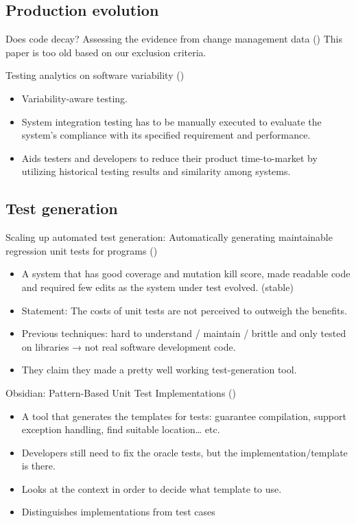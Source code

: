 \documentclass[]{book}
\providecommand{\tightlist}{%
  \setlength{\itemsep}{0pt}\setlength{\parskip}{0pt}}
\begin{document}
\subsection{Production evolution}\label{production-evolution}

Does code decay? Assessing the evidence from change management data
(\citet{eick2001}) This paper is too old based on our exclusion
criteria.

Testing analytics on software variability (\citet{leung2015testing})

\begin{itemize}
\tightlist
\item
  Variability-aware testing.
\item
  System integration testing has to be manually executed to evaluate the
  system's compliance with its specified requirement and performance.
\item
  Aids testers and developers to reduce their product time-to-market by
  utilizing historical testing results and similarity among systems.
\end{itemize}

\subsection{Test generation}\label{test-generation}

Scaling up automated test generation: Automatically generating
maintainable regression unit tests for programs (\citet{robinson2011})

\begin{itemize}
\tightlist
\item
  A system that has good coverage and mutation kill score, made readable
  code and required few edits as the system under test evolved. (stable)
\item
  Statement: The costs of unit tests are not perceived to outweigh the
  benefits.
\item
  Previous techniques: hard to understand / maintain / brittle and only
  tested on libraries → not real software development code.
\item
  They claim they made a pretty well working test-generation tool.
\end{itemize}

Obsidian: Pattern-Based Unit Test Implementations
(\citet{bowring2014obsidian})

\begin{itemize}
\tightlist
\item
  A tool that generates the templates for tests: guarantee compilation,
  support exception handling, find suitable location\ldots{} etc.
\item
  Developers still need to fix the oracle tests, but the
  implementation/template is there.
\item
  Looks at the context in order to decide what template to use.
\item
  Distinguishes implementations from test cases
\end{itemize}
\end{document}

